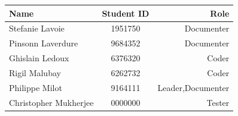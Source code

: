 \documentclass{article}
\begin{document}
\medskip
\begin{center}
\begin{tabular}{| l | c | r |}
\hline
Name & Student ID & Role \\
\hline
\hline
Stefanie Lavoie & 1951750 & Documenter\\
\hline
Pinsonn Laverdure & 9684352 & Documenter\\
\hline
Ghislain Ledoux & 6376320 & Coder\\
\hline
Rigil Malubay & 6262732 & Coder\\
\hline
Philippe Milot & 9164111 & Leader,Documenter \\
\hline
Christopher Mukherjee & 0000000 & Tester\\
\hline
\end{tabular}
\end{center}
\end{document}
